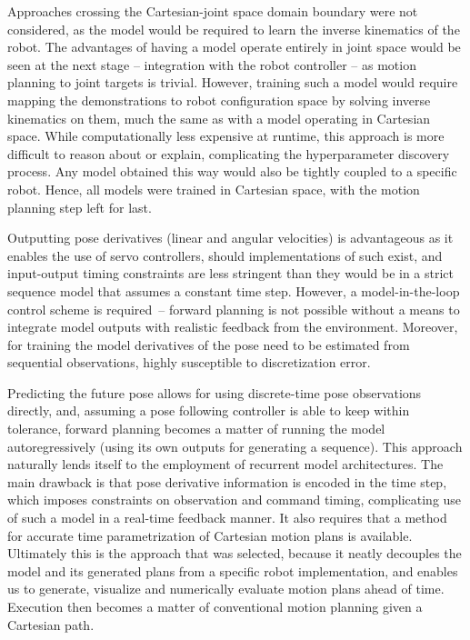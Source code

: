 \documentclass{article}
\begin{document}
Approaches crossing the Cartesian-joint space domain boundary were not considered, as the model would be required to learn the inverse kinematics of the robot. The advantages of having a model operate entirely in joint space would be seen at the next stage -- integration with the robot controller -- as motion planning to joint targets is trivial. However, training such a model would require mapping the demonstrations to robot configuration space by solving inverse kinematics on them, much the same as with a model operating in Cartesian space. While computationally less expensive at runtime, this approach is more difficult to reason about or explain, complicating the hyperparameter discovery process. Any model obtained this way would also be tightly coupled to a specific robot. Hence, all models were trained in Cartesian space, with the motion planning step left for last.

Outputting pose derivatives (linear and angular velocities) is advantageous as it enables the use of servo controllers, should implementations of such exist, and input-output timing constraints are less stringent than they would be in a strict sequence model that assumes a constant time step. However, a model-in-the-loop control scheme is required~-- forward planning is not possible without a means to integrate model outputs with realistic feedback from the environment. Moreover, for training the model derivatives of the pose need to be estimated from sequential observations, highly susceptible to discretization error. 

Predicting the future pose allows for using discrete-time pose observations directly, and, assuming a pose following controller is able to keep within tolerance, forward planning becomes a matter of running the model autoregressively (using its own outputs for generating a sequence). This approach naturally lends itself to the employment of recurrent model architectures. The main drawback is that pose derivative information is encoded in the time step, which imposes constraints on observation and command timing, complicating use of such a model in a real-time feedback manner. It also requires that a method for accurate time parametrization of Cartesian motion plans is available. Ultimately this is the approach that was selected, because it neatly decouples the model and its generated plans from a specific robot implementation, and enables us to generate, visualize and numerically evaluate motion plans ahead of time. Execution then becomes a matter of conventional motion planning given a Cartesian path.
\end{document}
